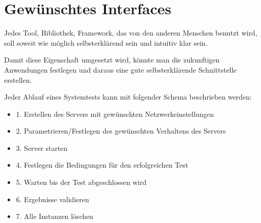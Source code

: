 \section{Gewünschtes Interfaces}
    Jedes Tool, Bibliothek, Framework, das von den anderen Menschen benutzt wird, 
    soll soweit wie möglich selbsterklärend sein und intuitiv klar sein.
    
    Damit diese Eigenschaft umgesetzt wird, könnte man die zukunftigen Anwendungen festlegen
    und daraus eine gute selbsterklärende Schnittstelle erstellen. 

    Jeder Ablauf eines Systemtests kann mit folgender Schema beschrieben werden:
    \begin{itemize}
        \item 1. Erstellen des Servers mit gewünschten Netzwerkeinstellungen
        \item 2. Parametrieren/Festlegen des gewünschten Verhaltens des Servers
        \item 3. Server starten
        \item 4. Festlegen die Bedingungen für den erfolgreichen Test 
        \item 5. Warten bis der Test abgeschlossen wird
        \item 6. Ergebnisse validieren
        \item 7. Alle Instanzen löschen
    \end{itemize}

